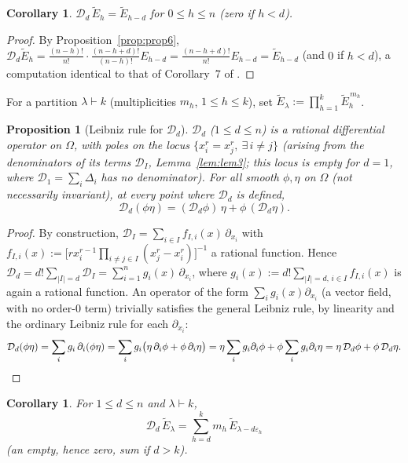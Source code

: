 \documentclass[10pt,a4paper]{amsart}
\newtheorem{proposition}[theorem]{Proposition}
\newtheorem{corollary}[theorem]{Corollary}
\begin{document}
\begin{corollary}\label{cor:cor7}
$\mathcal D_d\,\widetilde E_h = \widetilde E_{h-d}$ for $0\le h\le n$ (zero if $h<d$).
\end{corollary}

\begin{proof}
By Proposition~\ref{prop:prop6}, $\mathcal D_d\widetilde E_h = \frac{(n-h)!}{n!}\cdot\frac{(n-h+d)!}{(n-h)!}E_{h-d} = \frac{(n-h+d)!}{n!}E_{h-d} = \widetilde E_{h-d}$ (and $0$ if $h<d$), a computation identical to that of Corollary~7 of \cite{Ze}.
\end{proof}

For a partition $\lambda\vdash k$ (multiplicities $m_h$, $1\le h\le k$), set $\widetilde E_\lambda := \prod_{h=1}^{k}\widetilde E_h^{\,m_h}$.

\begin{proposition}[Leibniz rule for $\mathcal D_d$]\label{prop:leibniz}
$\mathcal D_d$ ($1\le d\le n$) is a \emph{rational} differential operator on $\Omega$, with poles on the locus $\{x_i^r=x_j^r,\ \exists\, i\ne j\}$ (arising from the denominators of its terms $\mathcal D_I$, Lemma~\ref{lem:lem3}; this locus is empty for $d=1$, where $\mathcal D_1=\sum_i\Delta_i$ has no denominator). For all smooth $\phi,\eta$ on $\Omega$ (not necessarily invariant), at every point where $\mathcal D_d$ is defined,
\[
\mathcal D_d(\phi\eta) = (\mathcal D_d\phi)\,\eta + \phi\,(\mathcal D_d\eta).
\]
\end{proposition}

\begin{proof}
By construction, $\mathcal D_I=\sum_{i\in I} f_{I,i}(x)\,\partial_{x_i}$ with $f_{I,i}(x):=\big[rx_i^{r-1}\prod_{i\ne j\in I}(x_j^r-x_i^r)\big]^{-1}$ a rational function. Hence $\mathcal D_d=d!\sum_{|I|=d}\mathcal D_I=\sum_{i=1}^n g_i(x)\,\partial_{x_i}$, where $g_i(x):=d!\sum_{|I|=d,\,i\in I} f_{I,i}(x)$ is again a rational function. An operator of the form $\sum_i g_i(x)\partial_{x_i}$ (a vector field, with no order-$0$ term) trivially satisfies the general Leibniz rule, by linearity and the ordinary Leibniz rule for each $\partial_{x_i}$:
\[
\mathcal D_d(\phi\eta) = \sum_i g_i\,\partial_i(\phi\eta) = \sum_i g_i\big(\eta\,\partial_i\phi + \phi\,\partial_i\eta\big) = \eta\sum_i g_i\partial_i\phi + \phi\sum_i g_i\partial_i\eta = \eta\,\mathcal D_d\phi + \phi\,\mathcal D_d\eta. \qedhere
\]
\end{proof}

\begin{corollary}\label{cor:cor8}
For $1\le d\le n$ and $\lambda\vdash k$,
\[
\mathcal D_d\, \widetilde E_\lambda = \sum_{h=d}^{k} m_h\, \widetilde E_{\lambda-d\varepsilon_h}
\]
(an empty, hence zero, sum if $d>k$).
\end{corollary}
\end{document}
